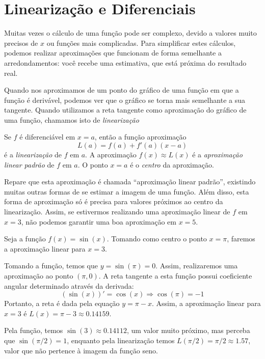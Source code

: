 \section{Linearização e Diferenciais}
Muitas vezes o cálculo de uma função pode ser complexo, devido a valores muito precisos de $x$ ou funções mais complicadas. Para simplificar estes cálculos, podemos realizar aproximações que funcionam de forma semelhante a arredondamentos: você recebe uma estimativa, que está próxima do resultado real. \par Quando nos aproximamos de um ponto do gráfico de uma função em que a função é derivável, podemos ver que o gráfico se torna mais semelhante a sua tangente. Quando utilizamos a reta tangente como aproximação do gráfico de uma função, chamamos isto de \emph{linearização}
\begin{df}
Se $f$ é diferenciável em $x=a$, então a função aproximação \[L(a)=f(a)+f'(a)(x-a)\] é a \emph{linearização} de $f$ em $a$. A aproximação $f(x)\approx L(x)$ é a \emph{aproximação linear padrão} de $f$ em $a$. O ponto $x=a$ é o \emph{centro} da aproximação.
\end{df}
Repare que esta aproximação é chamada ``aproximação linear padrão'', existindo muitas outras formas de se estimar a imagem de uma função. Além disso, esta forma de aproximação só é precisa para valores próximos ao centro da linearização. Assim, se estivermos realizando uma aproximação linear de $f$ em $x=3$, não podemos garantir uma boa aproximação em $x=5$.
\begin{exemplo}
Seja a função $f(x)=\sin(x)$. Tomando como centro o ponto $x=\pi$, faremos a aproximação linear para $x=3$.
\begin{center}
\end{center}%
Tomando a função, temos que $y=\sin(\pi)=0$. Assim, realizaremos uma aproximação ao ponto $(\pi,0)$. A reta tangente a esta função possui coeficiente angular determinado através da derivada:
\[(\sin(x))'=\cos(x) \Rightarrow \cos(\pi)=-1\]
Portanto, a reta é dada pela equação $y=\pi -x$. Assim, a aproximação linear para $x=3$ é $L(x)=\pi - 3 \approx 0.14159$. \par Pela função, temos $\sin(3) \approx 0.14112$, um valor muito próximo, mas perceba que $\sin (\pi/2) = 1$, enquanto pela linearização temos $L(\pi/2)=\pi/2\approx 1.57$, valor que não pertence à imagem da função seno.
\end{exemplo}


